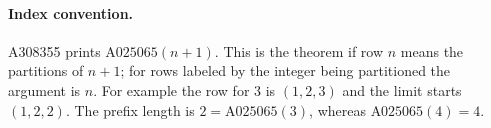 \documentclass[11pt,letterpaper]{article}
\begin{document}
\paragraph{Index convention.} A308355 prints $\text{A025065}(n+1)$. This is the theorem if row $n$ means the partitions of $n+1$; for rows labeled by the integer being partitioned the argument is $n$. For example the row for $3$ is $(1,2,3)$ and the limit starts $(1,2,2)$. The prefix length is $2=\text{A025065}(3)$, whereas $\text{A025065}(4)=4$.
\end{document}
